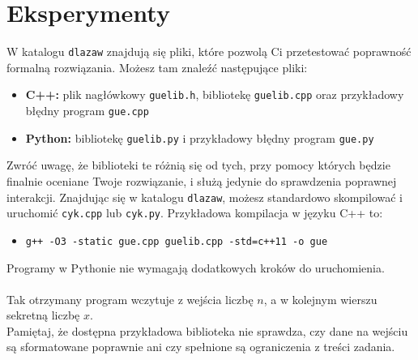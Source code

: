 \documentclass{spiral}
\begin{document}
\section{Eksperymenty}
    W katalogu \texttt{dlazaw} znajdują się pliki,
    które pozwolą Ci przetestować poprawność formalną rozwiązania.
    Możesz tam znaleźć następujące pliki:
    \begin{itemize}
        \item \textbf{C++:} plik nagłówkowy \texttt{guelib.h},
            bibliotekę \texttt{guelib.cpp}
            oraz przykładowy błędny program \texttt{gue.cpp}
        \item \textbf{Python:} bibliotekę \texttt{guelib.py}
            i przykładowy błędny program \texttt{gue.py}
    \end{itemize}
    
    \noindent Zwróć uwagę, że biblioteki te różnią się od tych,
    przy pomocy których będzie finalnie oceniane Twoje
    rozwiązanie, i służą jedynie do sprawdzenia poprawnej interakcji.
    Znajdując się w katalogu \texttt{dlazaw}, możesz
    standardowo skompilować i uruchomić \texttt{cyk.cpp} lub \texttt{cyk.py}.
    Przykładowa kompilacja w języku C++ to:

    \begin{itemize}
        \item \texttt{g++ -O3 -static gue.cpp guelib.cpp -std=c++11 -o gue}
    \end{itemize}
    
    \noindent Programy w Pythonie nie wymagają dodatkowych kroków do uruchomienia.\\
    \\
    Tak otrzymany program wczytuje z wejścia liczbę $n$,
    a w kolejnym wierszu sekretną liczbę $x$.
    \\
    Pamiętaj, że dostępna przykładowa biblioteka nie sprawdza,
    czy dane na wejściu są sformatowane poprawnie
    ani czy spełnione są ograniczenia z treści zadania.
\end{document}
